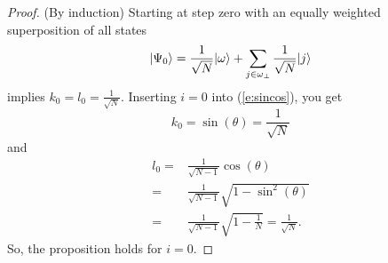 \begin{proof}
(By induction)  
Starting at step zero with an equally weighted 
superposition of all states
\begin{equation}
{|{\Psi_0}\rangle} = \frac{1}{\sqrt{N}}{|{\omega}\rangle} 
                + \sum_{j\in\omega_\perp}\frac{1}{\sqrt{N}}{|{j}\rangle}
\end{equation}
implies $k_0 = l_0 = \frac{1}{\sqrt{N}}$.
Inserting $i=0$ into (\ref{e:sincos}), you get
\begin{equation}
k_0 = \sin\left(\theta\right) = \frac{1}{\sqrt{N}}
\end{equation}
and 
\begin{equation}
\begin{split}
l_0 =& \frac{1}{\sqrt{N-1}}\cos\left(\theta\right)\\
    =& \frac{1}{\sqrt{N-1}}\sqrt{ 1 - \sin^2\left(\theta\right) }\\
    =& \frac{1}{\sqrt{N-1}}\sqrt{ 1 - \frac{1}{N} }
    = \frac{1}{\sqrt{N}}.
\end{split}
\end{equation}
So, the proposition holds for $i=0$.


\end{proof}
